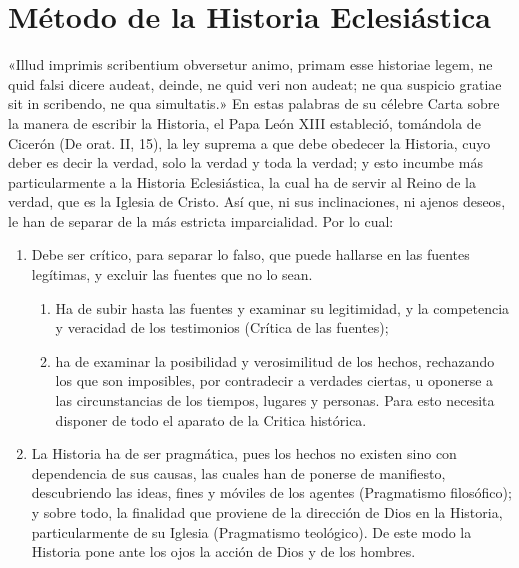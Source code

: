 \raggedbottom{} \documentclass[12pt, a4paper, openany]{book} %
\begin{document}
\section{Método de la Historia Eclesiástica}
«Illud imprimis scribentium obversetur animo, primam esse historiae legem, ne quid falsi dicere audeat, deinde, ne quid veri non audeat; ne qua suspicio gratiae sit in scribendo, ne qua simultatis.» En estas palabras de su célebre Carta sobre la manera de escribir la Historia, el Papa León XIII estableció, tomándola de Cicerón (De orat. II, 15), la ley suprema a que debe obedecer la Historia, cuyo deber es decir la verdad, solo la verdad y toda la verdad; y esto incumbe más particularmente a la Historia Eclesiástica, la cual ha de servir al Reino de la verdad, que es la Iglesia de Cristo. Así que, ni sus inclinaciones, ni ajenos deseos, le han de separar de la más estricta imparcialidad. Por lo cual: \begin{enumerate}
  \item Debe ser crítico, para separar lo falso, que puede hallarse en las fuentes legítimas, y excluir las fuentes que no lo sean.\begin{enumerate}
          \item Ha de subir hasta las fuentes y examinar su legitimidad, y la competencia y veracidad de los testimonios (Crítica de las fuentes);
          \item ha de examinar la posibilidad y verosimilitud de los hechos, rechazando los que son imposibles, por contradecir a verdades ciertas, u oponerse a las circunstancias de los tiempos, lugares y personas. Para esto necesita disponer de todo el aparato de la Critica histórica.
        \end{enumerate}
  \item La Historia ha de ser pragmática, pues los hechos no existen sino con dependencia de sus causas, las cuales han de ponerse de manifiesto, descubriendo las ideas, fines y móviles de los agentes (Pragmatismo filosófico); y sobre todo, la finalidad que proviene de la dirección de Dios en la Historia, particularmente de su Iglesia (Pragmatismo teológico). De este modo la Historia pone ante los ojos la acción de Dios y de los hombres.
\end{enumerate}
\end{document}
